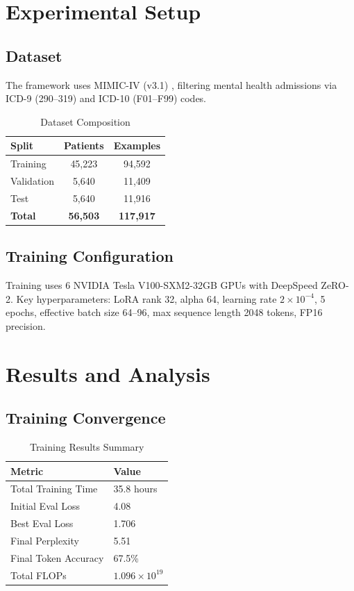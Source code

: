 \documentclass[conference]{IEEEtran}
\begin{document}
\section{Experimental Setup}

\subsection{Dataset}

The framework uses MIMIC-IV (v3.1) \cite{b14}, filtering mental health admissions via ICD-9 (290--319) and ICD-10 (F01--F99) codes.

\begin{table}[t]
\caption{Dataset Composition}
\label{tab:dataset}
\centering
\begin{tabular}{lcc}
\hline
\textbf{Split} & \textbf{Patients} & \textbf{Examples} \\
\hline
Training & 45,223 & 94,592 \\
Validation & 5,640 & 11,409 \\
Test & 5,640 & 11,916 \\
\hline
\textbf{Total} & \textbf{56,503} & \textbf{117,917} \\
\hline
\end{tabular}
\end{table}

\subsection{Training Configuration}

Training uses 6 NVIDIA Tesla V100-SXM2-32GB GPUs with DeepSpeed ZeRO-2. Key hyperparameters: LoRA rank 32, alpha 64, learning rate $2 \times 10^{-4}$, 5 epochs, effective batch size 64--96, max sequence length 2048 tokens, FP16 precision.

\section{Results and Analysis}

\subsection{Training Convergence}

\begin{table}[t]
\caption{Training Results Summary}
\label{tab:training_results}
\centering
\begin{tabular}{ll}
\hline
\textbf{Metric} & \textbf{Value} \\
\hline
Total Training Time & 35.8 hours \\
Initial Eval Loss & 4.08 \\
Best Eval Loss & 1.706 \\
Final Perplexity & 5.51 \\
Final Token Accuracy & 67.5\% \\
Total FLOPs & $1.096 \times 10^{19}$ \\
\hline
\end{tabular}
\end{table}
\end{document}

